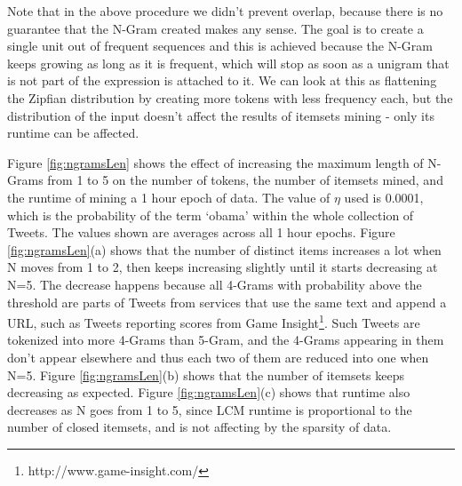 \documentclass{sig-alternate}
\begin{document}
Note that in the above procedure we didn't prevent overlap, because there is no guarantee that the N-Gram created makes any sense. The goal is to create a single unit out of frequent sequences and this is achieved because the N-Gram keeps growing as long as it is frequent, which will stop as soon as a unigram that is not part of the expression is attached to it. We can look at this as flattening the Zipfian distribution by creating more tokens with less frequency each, but the distribution of the input doesn't affect the results of itemsets mining - only its runtime can be affected.

Figure \ref{fig:ngramsLen} shows the effect of increasing the maximum length of N-Grams from 1 to 5 on the number of tokens, the number of itemsets mined, and the runtime of mining a 1 hour epoch of data. The value of $\eta$ used is 0.0001, which is the probability of the term `obama' within the whole collection of Tweets. The values shown are averages across all 1 hour epochs. Figure \ref{fig:ngramsLen}(a) shows that the number of distinct items increases a lot when N moves from 1 to 2, then keeps increasing slightly until it starts decreasing at N=5. The decrease happens because all 4-Grams with probability above the threshold are parts of Tweets from services that use the same text and append a URL, such as Tweets reporting scores from Game Insight\footnote{http://www.game-insight.com/}. Such Tweets are tokenized into more 4-Grams than 5-Gram, and the 4-Grams appearing in them don't appear elsewhere and thus each two of them are reduced into one when N=5.  Figure \ref{fig:ngramsLen}(b) shows that the number of itemsets keeps decreasing as expected.  Figure \ref{fig:ngramsLen}(c) shows that runtime also decreases as N goes from 1 to 5, since LCM runtime is proportional to the number of closed itemsets, and is not affecting by the sparsity of data. 
\end{document}
